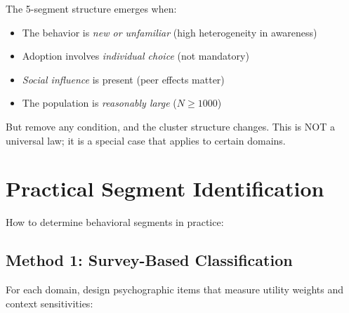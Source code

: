 The 5-segment structure emerges when:
\begin{itemize}[nosep]
    \item The behavior is \textit{new or unfamiliar} (high heterogeneity in awareness)
    \item Adoption involves \textit{individual choice} (not mandatory)
    \item \textit{Social influence} is present (peer effects matter)
    \item The population is \textit{reasonably large} ($N \geq 1000$)
\end{itemize}

But remove any condition, and the cluster structure changes. This is NOT a universal
law; it is a special case that applies to certain domains.

\section{Practical Segment Identification}
\label{sec:segment-identification}

How to determine behavioral segments in practice:

\subsection{Method 1: Survey-Based Classification}
\label{sec:survey-classification}

For each domain, design psychographic items that measure utility weights and
context sensitivities:

